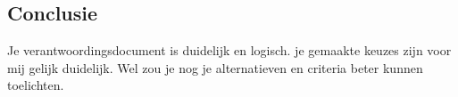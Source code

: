 \documentclass[a4paper]{article}
\begin{document}
\subsection{Conclusie}
Je verantwoordingsdocument is duidelijk en logisch. 
je gemaakte keuzes zijn voor mij gelijk duidelijk. Wel zou je nog je alternatieven en criteria beter kunnen toelichten.


% 
% 

\end{document}

